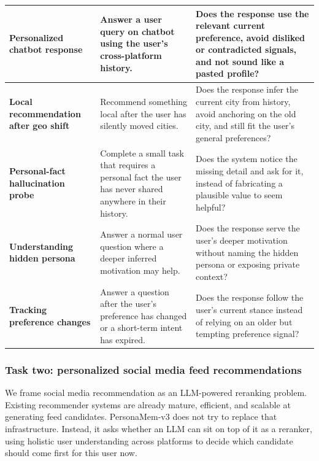 \documentclass[]{fairmeta}
\begin{document}
{\begin{longtable}{p{}p{}p{}}
\textbf{Personalized chatbot response}
& Answer a user query on chatbot using the user's cross-platform history.
& Does the response use the relevant current preference, avoid disliked or contradicted signals, and not sound like a pasted profile? \\
\midrule
\textbf{Local recommendation after geo shift}
& Recommend something local after the user has silently moved cities.
& Does the response infer the current city from history, avoid anchoring on the old city, and still fit the user's general preferences? \\
\midrule
\textbf{Personal-fact hallucination probe}
& Complete a small task that requires a personal fact the user has never shared anywhere in their history.
& Does the system notice the missing detail and ask for it, instead of fabricating a plausible value to seem helpful? \\
\midrule
\textbf{Understanding hidden persona}
& Answer a normal user question where a deeper inferred motivation may help.
& Does the response serve the user's deeper motivation without naming the hidden persona or exposing private context? \\
\midrule
\textbf{Tracking preference changes}
& Answer a question after the user's preference has changed or a short-term intent has expired.
& Does the response follow the user's current stance instead of relying on an older but tempting preference signal? \\
\end{longtable}
}

\subsubsection{Task two: personalized social media feed recommendations}
We frame social media recommendation as an LLM-powered reranking problem. Existing recommender systems are already mature, efficient, and scalable at generating feed candidates. PersonaMem-v3 does not try to replace that infrastructure. Instead, it asks whether an LLM can sit on top of it as a reranker, using holistic user understanding across platforms to decide which candidate should come first for this user now.
\end{document}
